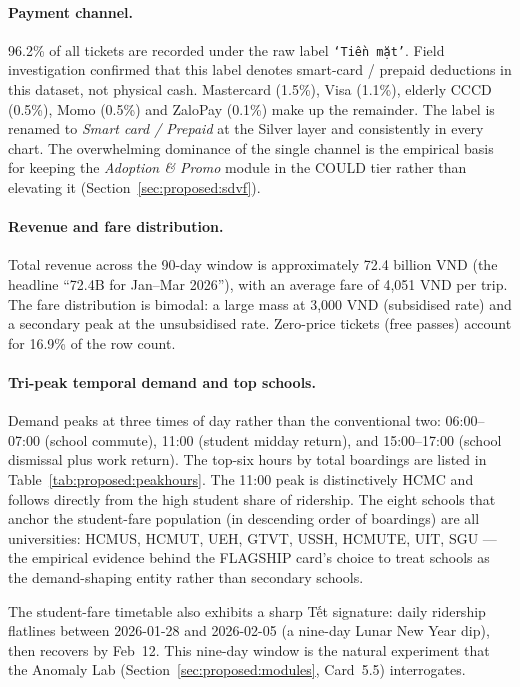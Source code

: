 \paragraph{Payment channel.}
96.2\% of all tickets are recorded under the raw label
\texttt{`Tiền mặt'}. Field investigation confirmed that this label
denotes smart-card / prepaid deductions in this dataset, not
physical cash. Mastercard (1.5\%), Visa (1.1\%), elderly CCCD
(0.5\%), Momo (0.5\%) and ZaloPay (0.1\%) make up the remainder.
The label is renamed to \emph{Smart card / Prepaid} at the Silver
layer and consistently in every chart. The overwhelming dominance
of the single channel is the empirical basis for keeping the
\emph{Adoption \& Promo} module in the COULD tier rather than
elevating it (Section~\ref{sec:proposed:sdvf}).

\paragraph{Revenue and fare distribution.}
Total revenue across the 90-day window is approximately 72.4
billion VND (the headline ``72.4B for Jan--Mar 2026''), with an
average fare of 4{,}051 VND per trip. The fare distribution is
bimodal: a large mass at 3{,}000 VND (subsidised rate) and a
secondary peak at the unsubsidised rate. Zero-price tickets (free
passes) account for 16.9\% of the row count.

\paragraph{Tri-peak temporal demand and top schools.}
Demand peaks at three times of day rather than the conventional
two: 06:00--07:00 (school commute), 11:00 (student midday return),
and 15:00--17:00 (school dismissal plus work return). The
top-six hours by total boardings are listed in
Table~\ref{tab:proposed:peakhours}. The 11:00 peak is
distinctively HCMC and follows directly from the high student
share of ridership. The eight schools that anchor the
student-fare population (in descending order of boardings) are
all universities: HCMUS, HCMUT, UEH, GTVT, USSH, HCMUTE, UIT, SGU
--- the empirical evidence behind the FLAGSHIP card's choice to
treat schools as the demand-shaping entity rather than secondary
schools.

The student-fare timetable also exhibits a sharp Tết signature:
daily ridership flatlines between 2026-01-28 and 2026-02-05 (a
nine-day Lunar New Year dip), then recovers by Feb~12. This
nine-day window is the natural experiment that the Anomaly Lab
(Section~\ref{sec:proposed:modules}, Card~5.5) interrogates.


